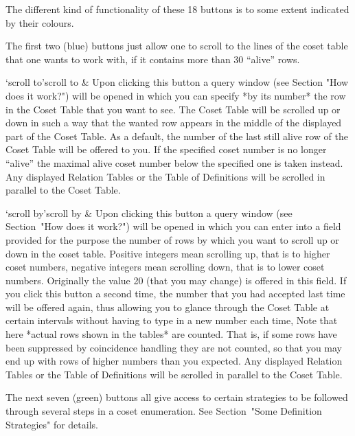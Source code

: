 \enditems


The different kind of functionality of these 18 buttons is
to some extent indicated by their colours.

The first two (blue) buttons just allow one to scroll to the lines of
the coset table that one wants to work with, if it contains more than
30 ``alive'' rows.

\beginitems

\>`scroll to'{scroll to} &
  Upon clicking this button a query window (see Section "How does it
  work?") will be opened in which you can specify *by its number* the
  row in the Coset Table that you want to see. The Coset Table will be
  scrolled up or down in such a way that the wanted row appears in the
  middle of the displayed part of the Coset Table. As a default, the
  number of the last still alive row of the Coset Table will be offered
  to you. If the specified coset number is no longer ``alive'' the
  maximal alive coset number below the specified one is taken instead.
  Any displayed Relation Tables or the Table of Definitions will be
  scrolled in parallel to the Coset Table.

\>`scroll by'{scroll by} &
  Upon clicking this button a query window (see Section~"How does it
  work?") will be opened in which you can enter into a field provided
  for the purpose the number of rows by which you want to scroll up or
  down in the coset table. Positive integers mean scrolling up, that is
  to higher coset numbers, negative integers mean scrolling down, that
  is to lower coset numbers. Originally the value 20 (that you may
  change) is offered in this field. If you click this button a second
  time, the number that you had accepted last time will be offered
  again, thus allowing you to glance through the Coset Table at certain
  intervals without having to type in a new number each time, Note that
  here *actual rows shown in the tables* are counted. That is, if some
  rows have been suppressed by coincidence handling they are not
  counted, so that you may end up with rows of higher numbers than you
  expected. Any displayed Relation Tables or the Table of Definitions
  will be scrolled in parallel to the Coset Table.

\enditems

The next seven (green) buttons all give access to certain strategies
to be followed through several steps in a coset enumeration. See
Section~"Some Definition Strategies" for details.

